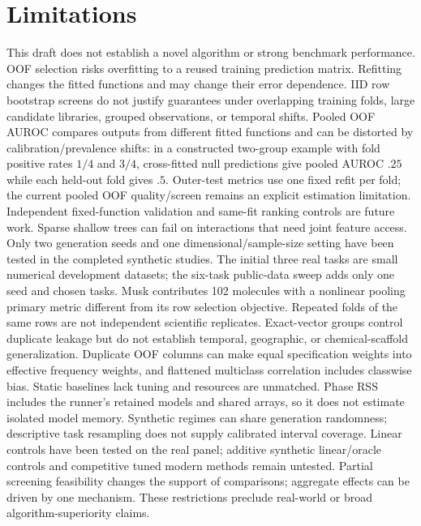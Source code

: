\section{Limitations}
This draft does not establish a novel algorithm or strong benchmark performance.
OOF selection risks overfitting to a reused training prediction matrix. Refitting
changes the fitted functions and may change their error dependence. IID row
bootstrap screens do not justify guarantees under overlapping training folds,
large candidate libraries, grouped observations, or temporal shifts.
Pooled OOF AUROC compares outputs from different fitted functions and can be
distorted by calibration/prevalence shifts: in a constructed two-group example
with fold positive rates $1/4$ and $3/4$, cross-fitted null predictions give
pooled AUROC $.25$ while each held-out fold gives $.5$. Outer-test metrics use
one fixed refit per fold; the current pooled OOF quality/screen remains an
explicit estimation limitation. Independent fixed-function validation and
same-fit ranking controls are future work. Sparse
shallow trees can fail on interactions that need joint feature access. Only two
generation seeds and one dimensional/sample-size setting have been tested in the
completed synthetic studies. The initial three real tasks are small numerical
development datasets; the six-task public-data sweep adds only
one seed and chosen tasks. Musk contributes 102 molecules with a nonlinear
pooling primary metric different from its row selection objective. Repeated
folds of the same rows are not independent
scientific replicates. Exact-vector groups control duplicate leakage but do not
establish temporal, geographic, or chemical-scaffold generalization.
Duplicate OOF columns can make equal specification weights into effective frequency
weights, and flattened multiclass correlation includes classwise bias. Static
baselines lack tuning and resources are unmatched.
Phase RSS includes the runner's retained models and shared arrays, so it does not
estimate isolated model memory. Synthetic regimes can share generation randomness;
descriptive task resampling does not supply calibrated interval coverage.
Linear controls have been tested on the real panel; additive synthetic linear/oracle
controls and competitive tuned modern methods remain untested.
Partial screening feasibility changes the support of comparisons; aggregate effects can
be driven by one mechanism. These restrictions preclude real-world or broad
algorithm-superiority claims.

